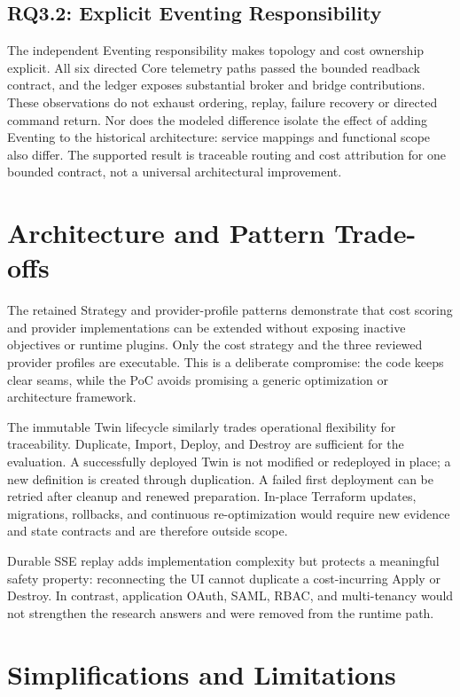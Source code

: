 \subsection{RQ3.2: Explicit Eventing Responsibility}

The independent Eventing responsibility makes topology and cost ownership
explicit. All six directed Core telemetry paths passed the bounded readback
contract, and the ledger exposes substantial broker and bridge contributions.
These observations do not exhaust ordering, replay, failure recovery or directed
command return. Nor does the modeled difference isolate the effect of adding
Eventing to the historical architecture: service mappings and functional scope
also differ. The supported result is traceable routing and cost attribution for
one bounded contract, not a universal architectural improvement.

\section{Architecture and Pattern Trade-offs}

The retained Strategy and provider-profile patterns demonstrate that cost
scoring and provider implementations can be extended without exposing inactive
objectives or runtime plugins. Only the cost strategy and the three reviewed
provider profiles are executable. This is a deliberate compromise: the code
keeps clear seams, while the PoC avoids promising a generic optimization or
architecture framework.

The immutable Twin lifecycle similarly trades operational flexibility for
traceability. Duplicate, Import, Deploy, and Destroy are sufficient for the
evaluation. A successfully deployed Twin is not modified or redeployed in
place; a new definition is created through duplication. A failed first
deployment can be retried after cleanup and renewed preparation. In-place Terraform updates, migrations,
rollbacks, and continuous re-optimization would require new evidence and state
contracts and are therefore outside scope.

Durable SSE replay adds implementation complexity but protects a meaningful
safety property: reconnecting the UI cannot duplicate a cost-incurring Apply
or Destroy. In contrast, application OAuth, SAML, RBAC, and multi-tenancy would
not strengthen the research answers and were removed from the runtime path.

\section{Simplifications and Limitations}

